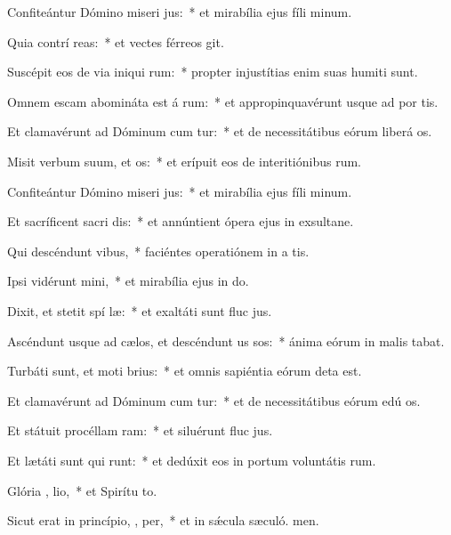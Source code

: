 \item Confiteántur Dómino miseri jus:~* et mirabília ejus fíli minum.
\item Quia contrí  reas:~* et vectes férreos git.
\item Suscépit eos de via iniqui rum:~* propter injustítias enim suas humiti sunt.
\item Omnem escam abomináta est á rum:~* et appropinquavérunt usque ad por tis.
\item Et clamavérunt ad Dóminum cum tur:~* et de necessitátibus eórum liberá os.
\item Misit verbum suum, et  os:~* et erípuit eos de interitiónibus rum.
\item Confiteántur Dómino miseri jus:~* et mirabília ejus fíli minum.
\item Et sacríficent sacri dis:~* et annúntient ópera ejus in exsultane.
\item Qui descéndunt   vibus,~* faciéntes operatiónem in a tis.
\item Ipsi vidérunt  mini,~* et mirabília ejus in do.
\item Dixit, et stetit spí læ:~* et exaltáti sunt fluc jus.
\item Ascéndunt usque ad cælos, et descéndunt us  sos:~* ánima eórum in malis tabat.
\item Turbáti sunt, et moti   brius:~* et omnis sapiéntia eórum deta est.
\item Et clamavérunt ad Dóminum cum tur:~* et de necessitátibus eórum edú os.
\item Et státuit procéllam   ram:~* et siluérunt fluc jus.
\item Et lætáti sunt qui runt:~* et dedúxit eos in portum voluntátis rum.
\item Glória ,  lio,~* et Spirítu to.
\item Sicut erat in princípio,  ,  per,~* et in sǽcula sæculó. men.
